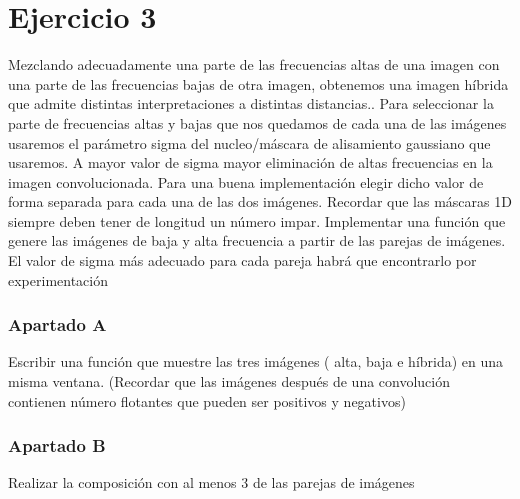 \documentclass{article}
\begin{document}
\section*{Ejercicio 3}
Mezclando adecuadamente una parte de las frecuencias altas de una imagen con una parte de las frecuencias bajas de otra imagen, obtenemos una imagen híbrida que admite distintas interpretaciones a distintas distancias..
Para seleccionar la parte de frecuencias altas y bajas que nos quedamos de cada una de las imágenes usaremos el parámetro sigma del nucleo/máscara de alisamiento gaussiano que usaremos. A mayor valor de sigma mayor eliminación de altas frecuencias en la imagen convolucionada. Para una buena implementación elegir dicho valor de forma separada para cada una de las dos imágenes. Recordar que las máscaras 1D siempre deben tener de longitud un número impar.
Implementar una función que genere las imágenes de baja y alta frecuencia a partir de las parejas de imágenes. El valor de sigma más adecuado para cada pareja habrá que encontrarlo por experimentación
\subsubsection{Apartado A} Escribir una función que muestre las tres imágenes ( alta, baja e híbrida) en una misma ventana. (Recordar que las imágenes después de una convolución contienen número flotantes que pueden ser positivos y negativos)
\subsubsection{Apartado B} Realizar la composición con al menos 3 de las parejas de
imágenes
\end{document}
